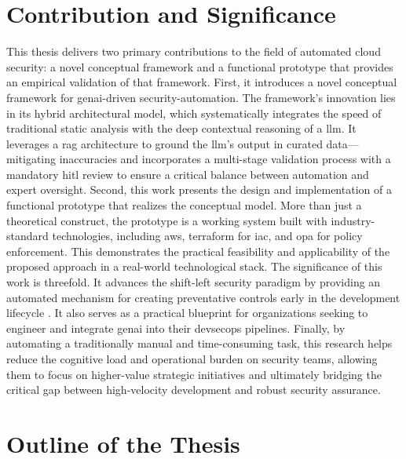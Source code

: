 \section{Contribution and Significance}
\label{sec:contribution}

This thesis delivers two primary contributions to the field of automated cloud security: a novel conceptual framework and a functional prototype that provides an empirical validation of that framework. First, it introduces a novel conceptual framework for \gls{genai}-driven \gls{security-automation}. The framework's innovation lies in its hybrid architectural model, which systematically integrates the speed of traditional static analysis with the deep contextual reasoning of a \gls{llm}. It leverages a \gls{rag} architecture to ground the \gls{llm}'s output in curated data—mitigating inaccuracies and incorporates a multi-stage validation process with a mandatory \gls{hitl} review to ensure a critical balance between automation and expert oversight. Second, this work presents the design and implementation of a functional prototype that realizes the conceptual model. More than just a theoretical construct, the prototype is a working system built with industry-standard technologies, including \gls{aws}, \gls{terraform} for \gls{iac}, and \gls{opa} for policy enforcement. This demonstrates the practical feasibility and applicability of the proposed approach in a real-world technological stack. The significance of this work is threefold. It advances the shift-left security paradigm by providing an automated mechanism for creating preventative controls early in the development lifecycle \cite{akto_shift_2025}. It also serves as a practical blueprint for organizations seeking to engineer and integrate \gls{genai} into their \gls{devsecops} pipelines. Finally, by automating a traditionally manual and time-consuming task, this research helps reduce the cognitive load and operational burden on security teams, allowing them to focus on higher-value strategic initiatives and ultimately bridging the critical gap between high-velocity development and robust security assurance.

\section{Outline of the Thesis}
\label{sec:outline}

